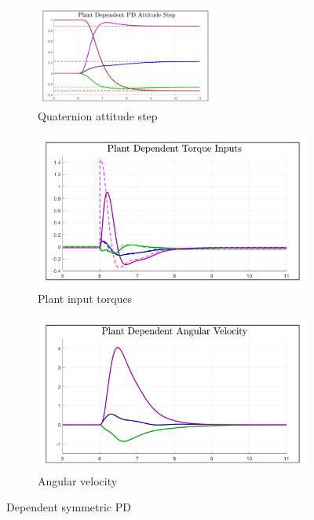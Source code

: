 \begin{figure}[htbp]
\centering
\begin{subfigure}{\textwidth}
\centering
\includegraphics[width=0.65\textwidth]{graphs/PD_3x3_Dependent_Step}
\caption{Quaternion attitude step}
\label{fig:PD_3x3_Dependent_Step}
\end{subfigure}
\begin{subfigure}{0.49\textwidth}
\centering
\includegraphics[width=\textwidth]{graphs/PD_3x3_Dependent_Torque}
\caption{Plant input torques}
\label{fig:PD_3x3_Dependent_Torque}
\end{subfigure}
\begin{subfigure}{0.49\textwidth}
\centering
\includegraphics[width=\textwidth]{graphs/PD_3x3_Dependent_Angular}
\caption{Angular velocity}
\label{fig:PD_3x3_Dependent_Angular}
\end{subfigure}
\caption{Dependent symmetric PD}
\end{figure}
